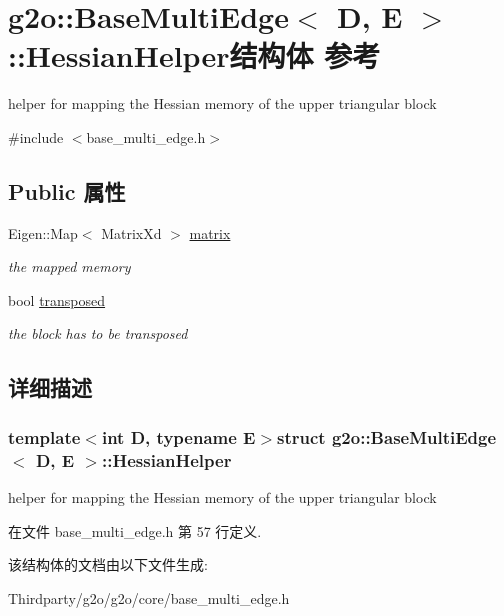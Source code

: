 \hypertarget{structg2o_1_1BaseMultiEdge_1_1HessianHelper}{\section{g2o\-:\-:Base\-Multi\-Edge$<$ D, E $>$\-:\-:Hessian\-Helper结构体 参考}
\label{structg2o_1_1BaseMultiEdge_1_1HessianHelper}
}


helper for mapping the Hessian memory of the upper triangular block  




{\ttfamily \#include $<$base\-\_\-multi\-\_\-edge.\-h$>$}

\subsection*{Public 属性}
\begin{DoxyCompactItemize}
\item 
\hypertarget{structg2o_1_1BaseMultiEdge_1_1HessianHelper_ab9eab8a9c5bf6e7814173d1955d7a01c}{Eigen\-::\-Map$<$ Matrix\-Xd $>$ \hyperlink{structg2o_1_1BaseMultiEdge_1_1HessianHelper_ab9eab8a9c5bf6e7814173d1955d7a01c}{matrix}}\label{structg2o_1_1BaseMultiEdge_1_1HessianHelper_ab9eab8a9c5bf6e7814173d1955d7a01c}

\begin{DoxyCompactList}\small\item\em the mapped memory \end{DoxyCompactList}\item 
\hypertarget{structg2o_1_1BaseMultiEdge_1_1HessianHelper_aeaff0227a982c30364d97ef9f0d9d60c}{bool \hyperlink{structg2o_1_1BaseMultiEdge_1_1HessianHelper_aeaff0227a982c30364d97ef9f0d9d60c}{transposed}}\label{structg2o_1_1BaseMultiEdge_1_1HessianHelper_aeaff0227a982c30364d97ef9f0d9d60c}

\begin{DoxyCompactList}\small\item\em the block has to be transposed \end{DoxyCompactList}\end{DoxyCompactItemize}


\subsection{详细描述}
\subsubsection*{template$<$int D, typename E$>$struct g2o\-::\-Base\-Multi\-Edge$<$ D, E $>$\-::\-Hessian\-Helper}

helper for mapping the Hessian memory of the upper triangular block 

在文件 base\-\_\-multi\-\_\-edge.\-h 第 57 行定义.



该结构体的文档由以下文件生成\-:\begin{DoxyCompactItemize}
\item 
Thirdparty/g2o/g2o/core/base\-\_\-multi\-\_\-edge.\-h\end{DoxyCompactItemize}
